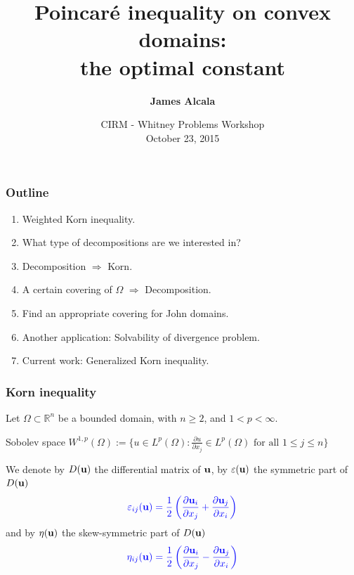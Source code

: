 \documentclass[small,xcolor=svgnames]{beamer}
\title[]{Poincar\'e inequality on convex domains:\\
the optimal constant}
\author[]{\bf James Alcala}
\institute[WPI]{
{\small}\\
  \vspace*{1cm}
 University of California Riverside\\
 Department of Mathematics}
\date{CIRM - Whitney Problems Workshop\\ October 23, 2015}
\def\O{\Omega}
\def\R{{\mathbb R}}
\def\uu{{\bf u}}
\def\c{\color{blue}}
\begin{document}
\frame{\titlepage}
\small


\begin{frame}\frametitle{Outline}

\begin{enumerate}
\item Weighted Korn inequality.
\item What type of decompositions are we interested in?  
\item Decomposition $\Rightarrow$ Korn.
\item A certain covering of $\Omega$ $\Rightarrow$ Decomposition.
\item Find an appropriate covering for John domains.
\item Another application: Solvability of divergence problem.
\item Current work: Generalized Korn inequality.

\end{enumerate}




\end{frame}


\begin{frame}\frametitle{Korn inequality}

Let $\O\subset\R^n$ be a bounded domain, with $n\geq 2$, and $1<p<\infty$.

\bigskip

Sobolev  space {\c $W^{1,p}(\Omega):=\{u\in L^p(\O):\frac{\partial u}{\partial x_j}\in L^p(\O)\text{ for all }1\leq j\leq n\}$}

We denote by $D(\uu)$ the differential matrix of $\uu$, by $\varepsilon(\uu)$ the symmetric part of $D(\uu)$ 
\[{\c \varepsilon_{ij}(\uu)=\frac{1}{2}\left(\frac{\partial \uu_i}{\partial x_j}+\frac{\partial \uu_j}{\partial x_i}\right)}\]
and by $\eta(\uu)$ the skew-symmetric part of $D(\uu)$ 
\[{\c \eta_{ij}(\uu)=\frac{1}{2}\left(\frac{\partial \uu_i}{\partial x_j}-\frac{\partial \uu_j}{\partial x_i}\right)}\]


\end{frame}


\end{document}

